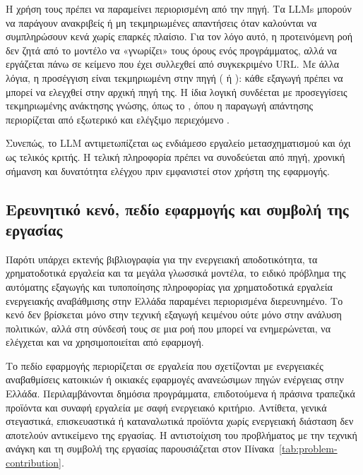 Η χρήση τους πρέπει να παραμείνει περιορισμένη από την πηγή. Τα LLMs μπορούν να
παράγουν ανακριβείς ή μη τεκμηριωμένες απαντήσεις όταν καλούνται να
συμπληρώσουν κενά χωρίς επαρκές πλαίσιο. Για τον λόγο αυτό, η προτεινόμενη ροή
δεν ζητά από το μοντέλο να «γνωρίζει» τους όρους ενός προγράμματος, αλλά να
εργάζεται πάνω σε κείμενο που έχει συλλεχθεί από συγκεκριμένο URL. Με άλλα
λόγια, η προσέγγιση είναι τεκμηριωμένη στην πηγή ( ή
): κάθε εξαγωγή πρέπει να μπορεί να ελεγχθεί στην αρχική
πηγή της. Η ίδια λογική συνδέεται με προσεγγίσεις τεκμηριωμένης ανάκτησης γνώσης, όπως το
, όπου η παραγωγή απάντησης περιορίζεται
από εξωτερικό και ελέγξιμο περιεχόμενο \cite{lewis2020rag}.

Συνεπώς, το LLM αντιμετωπίζεται ως ενδιάμεσο εργαλείο μετασχηματισμού και όχι
ως τελικός κριτής. Η τελική πληροφορία πρέπει να συνοδεύεται από πηγή, χρονική
σήμανση και δυνατότητα ελέγχου πριν εμφανιστεί στον χρήστη της εφαρμογής.

\subsection{Ερευνητικό κενό, πεδίο εφαρμογής και συμβολή της εργασίας}

Παρότι υπάρχει εκτενής βιβλιογραφία για την ενεργειακή αποδοτικότητα, τα
χρηματοδοτικά εργαλεία και τα μεγάλα γλωσσικά μοντέλα, το ειδικό πρόβλημα της
αυτόματης εξαγωγής και τυποποίησης πληροφορίας για χρηματοδοτικά εργαλεία
ενεργειακής αναβάθμισης στην Ελλάδα παραμένει περιορισμένα διερευνημένο. Το
κενό δεν βρίσκεται μόνο στην τεχνική εξαγωγή κειμένου ούτε μόνο στην ανάλυση
πολιτικών, αλλά στη σύνδεσή τους σε μια ροή που μπορεί να ενημερώνεται, να
ελέγχεται και να χρησιμοποιείται από εφαρμογή.

Το πεδίο εφαρμογής περιορίζεται σε εργαλεία που σχετίζονται με ενεργειακές
αναβαθμίσεις κατοικιών ή οικιακές εφαρμογές ανανεώσιμων πηγών ενέργειας στην
Ελλάδα. Περιλαμβάνονται δημόσια προγράμματα, επιδοτούμενα ή πράσινα τραπεζικά
προϊόντα και συναφή εργαλεία με σαφή ενεργειακό κριτήριο. Αντίθετα, γενικά
στεγαστικά, επισκευαστικά ή καταναλωτικά προϊόντα χωρίς ενεργειακή διάσταση
δεν αποτελούν αντικείμενο της εργασίας. Η αντιστοίχιση του προβλήματος με την
τεχνική ανάγκη και τη συμβολή της εργασίας παρουσιάζεται στον
Πίνακα~\ref{tab:problem-contribution}.

